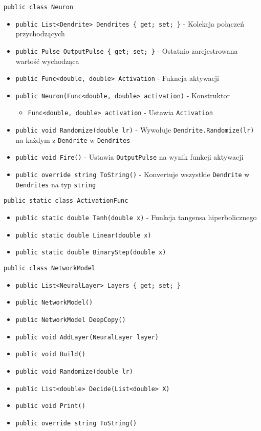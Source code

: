 \documentclass[12pt,a4paper]{article}
\begin{document}
\lstinline{public class Neuron}
\begin{itemize}
    \item \lstinline|public List<Dendrite> Dendrites { get; set; }| - Kolekcja połączeń przychodzących
    \item \lstinline|public Pulse OutputPulse { get; set; }| - Ostatnio zarejestrowana wartość wychodząca
    \item \lstinline|public Func<double, double> Activation| - Fukncja aktywacji
    \item \lstinline|public Neuron(Func<double, double> activation)| - Konstruktor
          \begin{itemize}
              \item \lstinline{Func<double, double> activation} - Ustawia \lstinline{Activation}
          \end{itemize}
    \item \lstinline|public void Randomize(double lr)| - Wywołuje \lstinline{Dendrite.Randomize(lr)} na każdym z \lstinline{Dendrite} w \lstinline{Dendrites}
    \item \lstinline|public void Fire()| - Ustawia \lstinline{OutputPulse} na wynik funkcji aktywacji
    \item \lstinline|public override string ToString()| - Konvertuje wszystkie \lstinline{Dendrite} w \lstinline{Dendrites} na typ \lstinline{string}
\end{itemize}


\lstinline{public static class ActivationFunc}
\begin{itemize}
    \item \lstinline|public static double Tanh(double x)| - Funkcja tangensa hiperbolicznego
    \item \lstinline|public static double Linear(double x)|
    \item \lstinline|public static double BinaryStep(double x)|
\end{itemize}


\lstinline{public class NetworkModel}
\begin{itemize}
    \item \lstinline|public List<NeuralLayer> Layers { get; set; }|
    \item \lstinline|public NetworkModel()|
    \item \lstinline|public NetworkModel DeepCopy()|
    \item \lstinline|public void AddLayer(NeuralLayer layer)|
    \item \lstinline|public void Build()|
    \item \lstinline|public void Randomize(double lr)|
    \item \lstinline|public List<double> Decide(List<double> X)|
    \item \lstinline|public void Print()|
    \item \lstinline|public override string ToString()|
\end{itemize}
\end{document}
